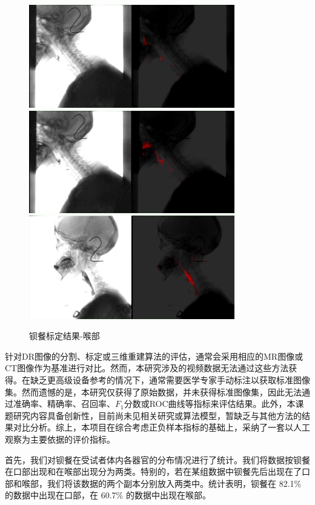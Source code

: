 \begin{figure}[!htp]
    \centering
    \includegraphics[width=0.8\textwidth]{figures/512.png}
    \includegraphics[width=0.8\textwidth]{figures/514.png}
    \includegraphics[width=0.8\textwidth]{figures/515.png}
    \caption{钡餐标定结果-喉部}
    \label{fig:5_结果2}
\end{figure}

针对DR图像的分割、标定或三维重建算法的评估，通常会采用相应的MR图像或CT图像作为基准进行对比。然而，本研究涉及的视频数据无法通过这些方法获得。在缺乏更高级设备参考的情况下，通常需要医学专家手动标注以获取标准图像集。然而遗憾的是，本研究仅获得了原始数据，并未获得标准图像集，因此无法通过准确率、精确率、召回率、$F_1$分数或ROC曲线等指标来评估结果。此外，本课题研究内容具备创新性，目前尚未见相关研究或算法模型，暂缺乏与其他方法的结果对比分析。综上，本项目在综合考虑正负样本指标的基础上，采纳了一套以人工观察为主要依据的评价指标。

首先，我们对钡餐在受试者体内各器官的分布情况进行了统计。我们将数据按钡餐在口部出现和在喉部出现分为两类。特别的，若在某组数据中钡餐先后出现在了口部和喉部，我们将该数据的两个副本分别放入两类中。统计表明，钡餐在 82.1\% 的数据中出现在口部，在 60.7\% 的数据中出现在喉部。

